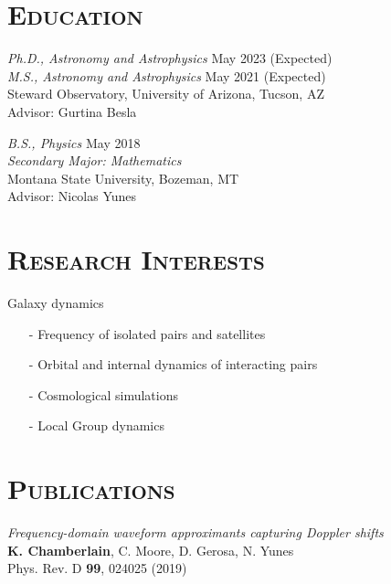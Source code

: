 \documentclass[margin]{res}
\begin{document}
\begin{resume}

\section{\textsc{Education}}

{\sl Ph.D., Astronomy and Astrophysics} \hfill        May 2023 (Expected)\\
{\sl M.S., Astronomy and Astrophysics} \hfill        May 2021 (Expected)\\
Steward Observatory, University of Arizona, Tucson, AZ\\
Advisor: Gurtina Besla


{\sl B.S., Physics} \hfill        May 2018 \\
\textit{Secondary Major: Mathematics}\\
Montana State University, Bozeman, MT\\
Advisor: Nicolas Yunes

 
\bigskip
\section{\textsc{Research Interests}}
Galaxy dynamics

\begin{itemize}
\item[-] Frequency of isolated pairs and satellites 
\item[-] Orbital and internal dynamics of interacting pairs
\item[-] Cosmological simulations
\item[-] Local Group dynamics 
\end{itemize}
\bigskip

\section{\textsc{Publications}}
\emph{Frequency-domain waveform approximants capturing Doppler shifts}\\
\textbf{K. Chamberlain}, C. Moore, D. Gerosa, N. Yunes\\
Phys. Rev. D \textbf{99}, 024025 (2019)


\end{resume}
\end{document}
